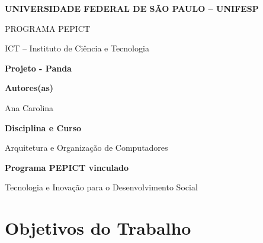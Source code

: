 \documentclass[12pt,a4paper]{article}
\begin{document}

\begin{center}

{\large \textbf{UNIVERSIDADE FEDERAL DE SÃO PAULO -- UNIFESP}}

\vspace{0.3cm}

{\normalsize PROGRAMA PEPICT}

\vspace{0.3cm}

{\normalsize ICT -- Instituto de Ciência e Tecnologia}

\vspace{1cm}

{\Large \textbf{Projeto - Panda}}

\end{center}

\vspace{1cm}


\noindent
\textbf{Autores(as)}

Ana Carolina

\vspace{0.7cm}


\noindent
\textbf{Disciplina e Curso}

Arquitetura e Organização de Computadores

\vspace{0.7cm}


\noindent
\textbf{Programa PEPICT vinculado}

Tecnologia e Inovação para o Desenvolvimento Social

\vspace{0.7cm}


\section*{Objetivos do Trabalho}
\end{document}
